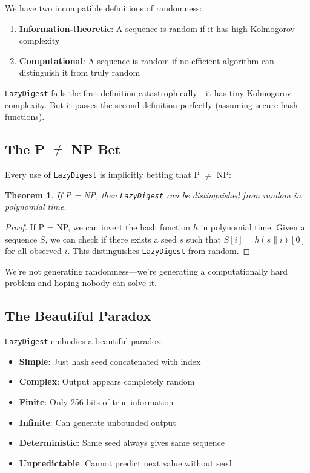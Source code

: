\documentclass[11pt]{article}
\newtheorem{theorem}{Theorem}
\begin{document}
We have two incompatible definitions of randomness:

\begin{enumerate}
\item \textbf{Information-theoretic}: A sequence is random if it has high Kolmogorov complexity
\item \textbf{Computational}: A sequence is random if no efficient algorithm can distinguish it from truly random
\end{enumerate}

\texttt{LazyDigest} fails the first definition catastrophically---it has tiny Kolmogorov complexity. But it passes the second definition perfectly (assuming secure hash functions).

\subsection{The P $\neq$ NP Bet}

Every use of \texttt{LazyDigest} is implicitly betting that P $\neq$ NP:

\begin{theorem}
If P = NP, then \texttt{LazyDigest} can be distinguished from random in polynomial time.
\end{theorem}

\begin{proof}
If P = NP, we can invert the hash function $h$ in polynomial time. Given a sequence $S$, we can check if there exists a seed $s$ such that $S[i] = h(s \| i)[0]$ for all observed $i$. This distinguishes \texttt{LazyDigest} from random.
\end{proof}

We're not generating randomness---we're generating a computationally hard problem and hoping nobody can solve it.

\subsection{The Beautiful Paradox}

\texttt{LazyDigest} embodies a beautiful paradox:

\begin{itemize}
\item \textbf{Simple}: Just hash seed concatenated with index
\item \textbf{Complex}: Output appears completely random
\item \textbf{Finite}: Only 256 bits of true information
\item \textbf{Infinite}: Can generate unbounded output
\item \textbf{Deterministic}: Same seed always gives same sequence
\item \textbf{Unpredictable}: Cannot predict next value without seed
\end{itemize}
\end{document}
